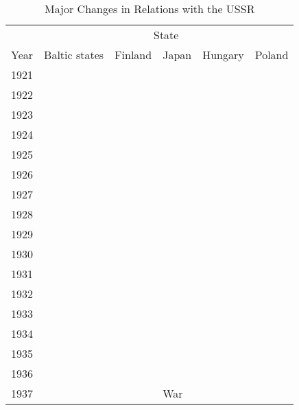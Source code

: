 \begin{table}[]
\centering
\caption{Major Changes in Relations with the USSR}
\label{tab:geopol_relations}
\begin{tabular}{@{}llllll@{}}
\toprule
     & \multicolumn{5}{c}{State}                                              \\ \cmidrule(l{2pt}r{2pt}){2-6}
Year & Baltic states   & Finland  & Japan      & Hungary  & Poland            \\ \midrule
1921 &                 &          &            &          &                   \\
1922 &                 &          &            &          &                   \\
1923 &                 &          &            &          &                   \\
1924 &                 &          &            &          &                   \\
1925 &                 &          &            &          &                   \\
1926 &                 &          &            &          &                   \\
1927 &                 &          &            &          &                   \\
1928 &                 &          &            &          &                   \\
1929 &                 &          &            &          &                   \\
1930 &                 &          &            &          &                   \\
1931 &                 &          &            &          &                   \\
1932 &                 &          &            &          &                   \\
1933 &                 &          &            &          &                   \\
1934 &                 &          &            &          &                   \\
1935 &                 &          &            &          &                   \\
1936 &                 &          &            &          &                   \\
1937 &                 &          & War        &          &                   \\

\end{tabular}
\end{table}
